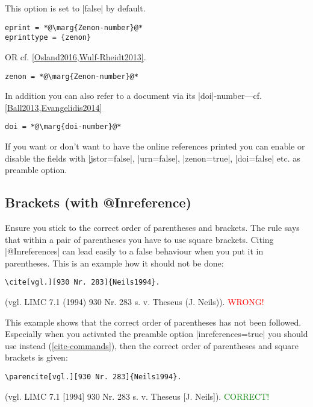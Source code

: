 \documentclass[a4paper,
10pt,
greek,
french,
spanish,
italian,
ngerman,
english
]{ltxdoc}
\begin{document}
This option is set to |false| by default.
\begin{lstlisting}
eprint = *@\marg{Zenon-number}@*
eprinttype = {zenon} 
\end{lstlisting}			
OR  cf. \cref{Osland2016,Wulf-Rheidt2013}.
\begin{lstlisting}
zenon = *@\marg{Zenon-number}@*
\end{lstlisting}			


 In addition you can also refer to a document via its |doi|-number---cf. \cref{Ball2013,Evangelidis2014} 
\begin{lstlisting}
doi = *@\marg{doi-number}@*
\end{lstlisting}	

If you want or don’t want to have the online references printed you can enable or disable the fields with |jstor=false|, 
|urn=false|,
|zenon=true|,
|doi=false| etc. as preamble option.

\subsection{Brackets (with @Inreference)}\label{faq:inreference}
Ensure you stick to the correct order of parentheses and brackets.
The rule says that within a pair of parentheses you have to use square brackets.
Citing |@Inreferences| can lead easily to a false behaviour when you put it in parentheses.
This is an example how it should not be done:
\begin{lstlisting}
\cite[vgl.][930 Nr. 283]{Neils1994}.
\end{lstlisting}
 \begin{bsp}
(vgl. LIMC 7.1 (1994) 930 Nr. 283 s. v. Theseus (J. Neils)). \textcolor{red}{WRONG!}
\end{bsp}
 
\DescribeMacro{\parencite} \DescribeMacro{\parencites}
This example shows that the correct order of parentheses has not been followed.
Especially when you activated the preamble option  |inreferences=true|  you should use  instead (\cref{cite-commands}), then the correct order of parentheses and square brackets is given:
\begin{lstlisting}
\parencite[vgl.][930 Nr. 283]{Neils1994}.
\end{lstlisting}

\begin{bsp} 
(vgl. LIMC 7.1 [1994] 930 Nr. 283 s. v. Theseus [J. Neils]). \textcolor{green}{CORRECT!}
\end{bsp}
\end{document}
